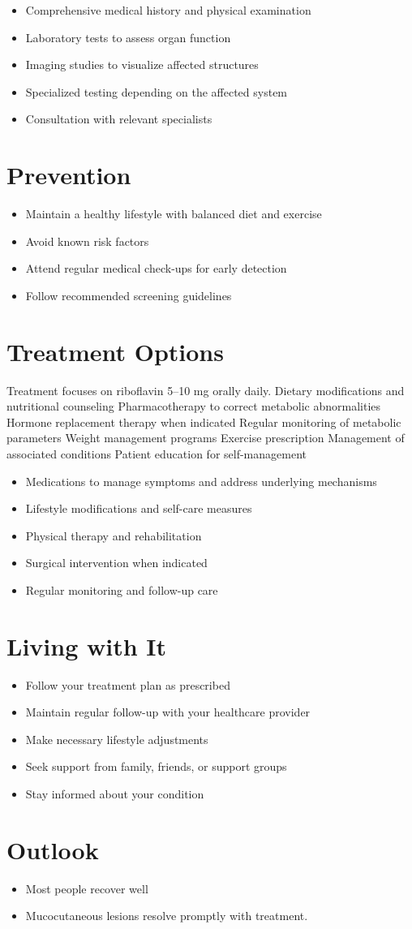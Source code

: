 \begin{itemize}[noitemsep]
  \item Comprehensive medical history and physical examination
  \item Laboratory tests to assess organ function
  \item Imaging studies to visualize affected structures
  \item Specialized testing depending on the affected system
  \item Consultation with relevant specialists
\end{itemize}
\section{Prevention}
\begin{itemize}[noitemsep]
  \item Maintain a healthy lifestyle with balanced diet and exercise
  \item Avoid known risk factors
  \item Attend regular medical check-ups for early detection
  \item Follow recommended screening guidelines
\end{itemize}
\section{Treatment Options}
Treatment focuses on riboflavin 5--10 mg orally daily. Dietary modifications and nutritional counseling Pharmacotherapy to correct metabolic abnormalities Hormone replacement therapy when indicated Regular monitoring of metabolic parameters Weight management programs Exercise prescription Management of associated conditions Patient education for self-management

\begin{itemize}[noitemsep]
  \item Medications to manage symptoms and address underlying mechanisms
  \item Lifestyle modifications and self-care measures
  \item Physical therapy and rehabilitation
  \item Surgical intervention when indicated
  \item Regular monitoring and follow-up care
\end{itemize}
\section{Living with It}
\begin{itemize}[noitemsep]
  \item Follow your treatment plan as prescribed
  \item Maintain regular follow-up with your healthcare provider
  \item Make necessary lifestyle adjustments
  \item Seek support from family, friends, or support groups
  \item Stay informed about your condition
\end{itemize}
\section{Outlook}
\begin{itemize}[noitemsep]
  \item Most people recover well
  \item Mucocutaneous lesions resolve promptly with treatment.
\end{itemize}
